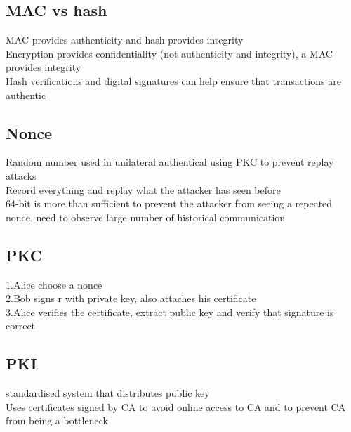 \documentclass[11pt]{article}
\begin{document}
\begin{multicols*}{3}
\subsection*{MAC vs hash}
MAC provides authenticity and hash provides integrity\\
Encryption provides confidentiality (not authenticity and integrity), a MAC provides integrity\\
Hash verifications and digital signatures can help ensure that transactions are authentic
\subsection*{Nonce}
Random number used in unilateral authentical using PKC to prevent replay attacks\\
Record everything and replay what the attacker has seen before\\
64-bit is more than sufficient to prevent the attacker from seeing a repeated nonce, need to observe large number of historical communication\\
\subsection*{PKC}
1.Alice choose a nonce\\
2.Bob signs r with private key, also attaches his certificate\\
3.Alice verifies the certificate, extract public key and verify that signature is correct
\subsection*{PKI}
standardised system that distributes public key\\
Uses certificates signed by CA to avoid online access to CA and to prevent CA from being a bottleneck\\

\end{multicols*}
\end{document}

